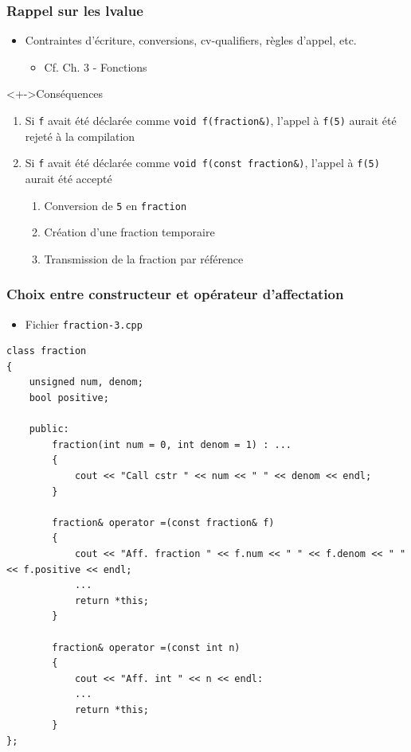 \begin{frame}
\frametitle{Rappel sur les lvalue}
\begin{itemize}
\item Contraintes d'écriture, conversions, cv-qualifiers, règles d'appel, etc.
	\begin{itemize}
	\item Cf. Ch. 3 - Fonctions
	\end{itemize}
\end{itemize}
\begin{exampleblock}<+->{Conséquences}
	\begin{enumerate}[<+->]
	\item Si \texttt{f} avait été déclarée comme \lstinline|void f(fraction&)|, l'appel à \texttt{f(5)} aurait été rejeté à la compilation
	\item Si \texttt{f} avait été déclarée comme \lstinline|void f(const fraction&)|, l'appel à \texttt{f(5)} aurait été accepté
		\begin{enumerate}
		\item Conversion de \texttt{5} en \texttt{fraction}
		\item Création d'une fraction temporaire
		\item Transmission de la fraction par référence
		\end{enumerate}
	\end{enumerate}
\end{exampleblock}
\end{frame}

\begin{frame}[containsverbatim]
\frametitle{Choix entre constructeur et opérateur d'affectation}
\begin{itemize}
\item Fichier \texttt{fraction-3.cpp}
\end{itemize}
\begin{lstlisting}
class fraction
{
	unsigned num, denom;
	bool positive;

	public:
		fraction(int num = 0, int denom = 1) : ...
		{
			cout << "Call cstr " << num << " " << denom << endl;
		}	

		fraction& operator =(const fraction& f)
		{
			cout << "Aff. fraction " << f.num << " " << f.denom << " " << f.positive << endl;
			...
			return *this;
		}

		fraction& operator =(const int n)
		{
			cout << "Aff. int " << n << endl:
			...
			return *this;
		}	
};
\end{lstlisting}
\end{frame}

